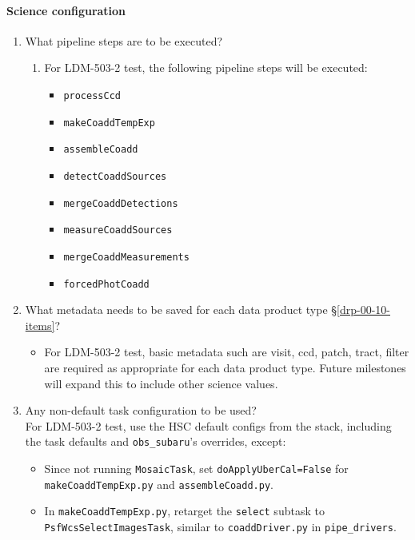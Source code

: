 \paragraph{Science configuration}
\begin{enumerate}
    \item{What pipeline steps are to be executed?}
    \begin{enumerate}
        \item{For LDM-503-2 test, the following pipeline steps will be executed: }
        \begin{itemize}
        \item{\texttt{processCcd}}
        \item{\texttt{makeCoaddTempExp}}
        \item{\texttt{assembleCoadd}}
        \item{\texttt{detectCoaddSources}}
        \item{\texttt{mergeCoaddDetections}}
        \item{\texttt{measureCoaddSources}}
        \item{\texttt{mergeCoaddMeasurements}}
        \item{\texttt{forcedPhotCoadd}}
        \end{itemize}
    \end{enumerate}
    \item{What metadata needs to be saved for each data product type \S\ref{drp-00-10-items}?}
    \begin{itemize}
        \item{For LDM-503-2 test, basic metadata such are visit, ccd, patch, tract, filter are required as appropriate for each data product type.   Future milestones will expand this to include other science values.}
    \end{itemize}
    \item{Any non-default task configuration to be used?} \\
        For LDM-503-2 test, use the HSC default configs from the stack, 
        including the task defaults and \texttt{obs{\_}subaru}’s overrides, except:
        \begin{itemize}
            \item{Since not running \texttt{MosaicTask}, set \texttt{doApplyUberCal=False} for \texttt{makeCoaddTempExp.py} and \texttt{assembleCoadd.py}.}
            \item{In \texttt{makeCoaddTempExp.py}, retarget the \texttt{select} subtask to \texttt{PsfWcsSelectImagesTask}, similar to \texttt{coaddDriver.py} in \texttt{pipe{\_}drivers}.}
        \end{itemize}
\end{enumerate}
